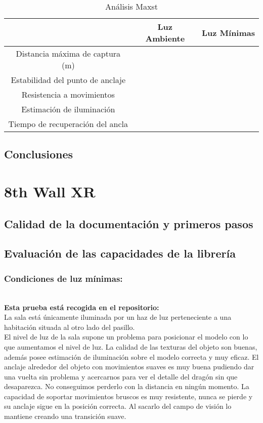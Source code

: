 \begin{table}[H]
    \centering
    \begin{tabular}{|c|c|c|}
    \hline
          & Luz Ambiente & Luz Mínimas \\
         \hline
        Distancia máxima de captura (m)  & &\\
        \hline
        Estabilidad del punto de anclaje  & &\\
        \hline
        Resistencia a movimientos  & & \\
        \hline
        Estimación de iluminación  & & \\
        \hline
        Tiempo de recuperación del ancla  & & \\
      \hline
    \end{tabular}
    \caption{Análisis Maxst}
    \label{tab:TMaxst}
\end{table}
\subsection{Conclusiones}

\clearpage
\section{8th Wall XR}
\subsection{Calidad de la documentación y primeros pasos}

\subsection{Evaluación de las capacidades de la librería}
\subsubsection{Condiciones de luz mínimas:}\\
\textbf{Esta prueba está recogida en el repositorio:}\\
La sala está únicamente iluminada por un haz de luz perteneciente a una habitación situada al otro lado del pasillo.\\

El nivel de luz de la sala supone un problema para posicionar el modelo con lo que aumentamos el nivel de luz. La calidad de las texturas del objeto son buenas, además posee estimación de iluminación sobre el modelo correcta y muy eficaz. El anclaje alrededor del objeto con movimientos suaves es muy buena pudiendo dar una vuelta sin problema y acercarnos para ver el detalle del dragón sin que desaparezca. No conseguimos perderlo con la distancia en ningún momento. La capacidad de soportar movimientos bruscos es muy resistente, nunca se pierde y su anclaje sigue en la posición correcta. Al sacarlo del campo de visión lo mantiene creando una transición suave. 

